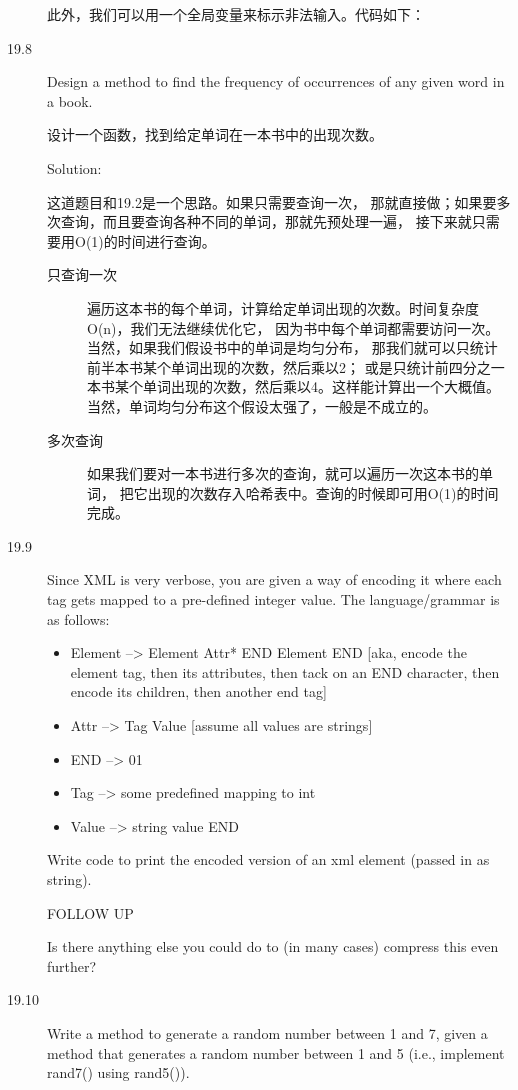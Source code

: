 \begin{description}
此外，我们可以用一个全局变量来标示非法输入。代码如下：



\item[19.8] Design a method to find the frequency of occurrences of any given word in a book.

设计一个函数，找到给定单词在一本书中的出现次数。

Solution: 

这道题目和19.2是一个思路。如果只需要查询一次， 那就直接做；如果要多次查询，而且要查询各种不同的单词，那就先预处理一遍， 接下来就只需要用O(1)的时间进行查询。
\begin{description}
\item[只查询一次] 遍历这本书的每个单词，计算给定单词出现的次数。时间复杂度O(n)，我们无法继续优化它， 因为书中每个单词都需要访问一次。当然，如果我们假设书中的单词是均匀分布， 那我们就可以只统计前半本书某个单词出现的次数，然后乘以2； 或是只统计前四分之一本书某个单词出现的次数，然后乘以4。这样能计算出一个大概值。 当然，单词均匀分布这个假设太强了，一般是不成立的。
\item[多次查询] 如果我们要对一本书进行多次的查询，就可以遍历一次这本书的单词， 把它出现的次数存入哈希表中。查询的时候即可用O(1)的时间完成。
\end{description}
%


\item[19.9] Since XML is very verbose, you are given a way of encoding it where each tag gets mapped to a pre-defined integer value. The language/grammar is as follows:	
\begin{itemize}	
\item Element --> Element Attr* END Element END [aka, encode the element tag, then its attributes, then tack on an END character, then encode its children, then another end tag]
\item Attr --> Tag Value [assume all values are strings]
\item END --> 01
\item Tag --> some predefined mapping to int
\item Value --> string value END
\end{itemize}
Write code to print the encoded version of an xml element (passed in as string).

FOLLOW UP

Is there anything else you could do to (in many cases) compress this even further?
%


\item[19.10] Write a method to generate a random number between 1 and 7, given a method that generates a random number between 1 and 5 (i.e., implement rand7() using rand5()).


\end{description}
